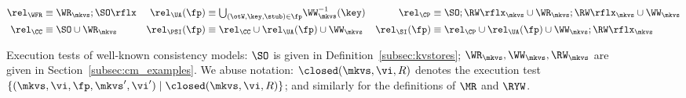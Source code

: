 \begin{figure*}[!t]
{\small
\begin{align*}
    \rel_{\WFR} & \equiv \WR_{\mkvs} ; \SO\rflx &
    \rel_{\UA}(\fp) & \equiv {\textstyle\bigcup_{(\otW, \key, \stub) \in \fp}} \WW^{-1}_{\mkvs}(\key) &
    \rel_{\CP} &\equiv \SO;\RW\rflx_\mkvs \cup \WR_\mkvs
                 ;\RW\rflx_\mkvs  \cup \WW_\mkvs  \\
    \rel_{\CC}  & \equiv \SO \cup \WR_{\mkvs} &
    \rel_{\PSI}(\fp) &\equiv \rel_{\CC} \cup \rel_{\UA}(\fp) \cup \WW_\mkvs &
    \rel_{\SI}(\fp) & \equiv \rel_{\CP} \cup \rel_{\UA}(\fp) \cup
                      \WW_\mkvs ;\RW\rflx_\mkvs
\end{align*}
}%
%
%
%
\hrulefill

\caption{Execution tests of well-known consistency models:
$\SO$ is given in Definition~\cref{subsec:kvstores}; 
\( \WR_\mkvs, \WW_\mkvs, \RW_\mkvs\) are given in Section~\cref{subsec:cm_examples}.
We abuse notation: $\closed(\mkvs, \vi, R)$ denotes the execution test 
$\{(\mkvs, \vi, \fp, \mkvs', \vi') \mid \closed(\mkvs, \vi, R)\}$;
and similarly for the definitions of \( \MR \) and \( \RYW \).
}
\label{fig:execution.tests}
\label{fig:execution_tests}
\label{fig:execution-tests}
\end{figure*}
